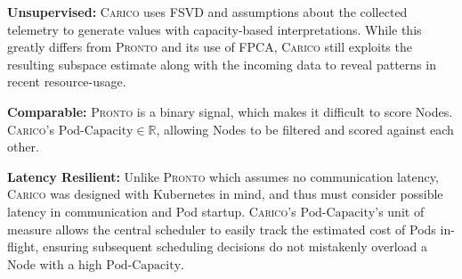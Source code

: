\textbf{Unsupervised:} \textsc{Carico} uses FSVD and assumptions about the
collected telemetry to generate values with capacity-based interpretations.
While this greatly differs from \textsc{Pronto} and its use of FPCA,
\textsc{Carico} still exploits the resulting subspace estimate along with the
incoming data to reveal patterns in recent resource-usage.

\textbf{Comparable:} \textsc{Pronto} is a binary signal, which makes it
difficult to score Nodes. \textsc{Carico}'s $\text{Pod-Capacity} \in
\mathbb{R}$, allowing Nodes to be filtered and scored against each other.

\textbf{Latency Resilient:} Unlike \textsc{Pronto} which assumes no communication
latency, \textsc{Carico} was designed with Kubernetes in mind, and thus must consider
possible latency in communication and Pod startup. \textsc{Carico}'s
$\text{Pod-Capacity}$'s unit of measure allows the central scheduler to easily
track the estimated cost of Pods in-flight, ensuring subsequent scheduling
decisions do not mistakenly overload a Node with a high $\text{Pod-Capacity}$.
%
%
%
%

